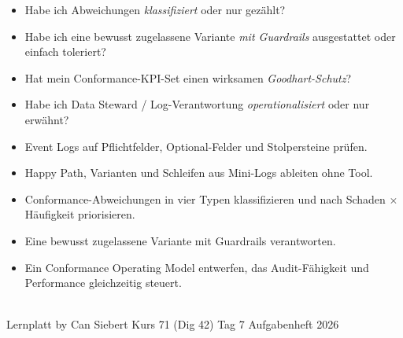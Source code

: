 \documentclass[11pt,a4paper,oneside]{article}
\begin{document}
\begin{itemize}
  \item Habe ich Abweichungen \emph{klassifiziert} \textendash{} oder nur gez\"ahlt?
  \item Habe ich eine bewusst zugelassene Variante \emph{mit Guardrails} ausgestattet \textendash{} oder einfach toleriert?
  \item Hat mein Conformance-KPI-Set einen wirksamen \emph{Goodhart-Schutz}?
  \item Habe ich Data Steward / Log-Verantwortung \emph{operationalisiert} \textendash{} oder nur erw\"ahnt?
\end{itemize}

\medskip
\begin{infobox}
\begin{itemize}
  \item Event Logs auf Pflichtfelder, Optional-Felder und Stolpersteine pr\"ufen.
  \item Happy Path, Varianten und Schleifen aus Mini-Logs ableiten \textendash{} ohne Tool.
  \item Conformance-Abweichungen in vier Typen klassifizieren \textendash{} und nach Schaden $\times$ H\"aufigkeit priorisieren.
  \item Eine bewusst zugelassene Variante mit Guardrails verantworten.
  \item Ein Conformance Operating Model entwerfen, das Audit-F\"ahigkeit und Performance gleichzeitig steuert.
\end{itemize}
\end{infobox}

\vspace{1cm}
\noindent{\color{lpAccent}\rule{\linewidth}{0.6pt}}\\[4pt]
{\footnotesize\sffamily\color{lpGray}Lernplatt \textperiodcentered{} by Can Siebert \textperiodcentered{} Kurs 71 (Dig 42) \textperiodcentered{} Tag 7 \textperiodcentered{} Aufgabenheft \textperiodcentered{} \textcopyright{} 2026}
\end{document}
